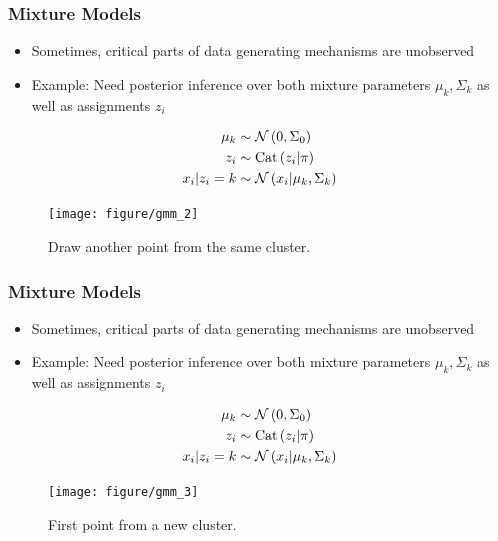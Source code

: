 \documentclass[10pt,mathserif]{beamer}
\begin{document}
\label{sec:latent_variable_models}
\begin{frame}
  \frametitle{Mixture Models}
  \begin{itemize}
  \item Sometimes, critical parts of data generating mechanisms are unobserved
    \item Example: Need posterior inference over both mixture parameters $\mu_k,
      \Sigma_k$ as well as assignments $z_i$
  \end{itemize}
  \begin{align*}
    \mu_{k} &\sim \mathcal{N}\left(0, \Sigma_{0}\right) \\
    z_i &\sim \textnormal{Cat}\left(z_i \vert \pi\right) \\
    x_i \vert z_i = k &\sim \mathcal{N}\left(x_i \vert \mu_{k}, \Sigma_k\right)
  \end{align*}
\begin{figure}[ht]
  \centering
  \texttt{[image: figure/gmm\_2]}
  \caption{Draw another point from the same cluster.
    \label{fig:gmm_2} }
\end{figure}
\end{frame}

\label{sec:latent_variable_models}
\begin{frame}
  \frametitle{Mixture Models}
  \begin{itemize}
  \item Sometimes, critical parts of data generating mechanisms are unobserved
    \item Example: Need posterior inference over both mixture parameters $\mu_k,
      \Sigma_k$ as well as assignments $z_i$
  \end{itemize}
  \begin{align*}
    \mu_{k} &\sim \mathcal{N}\left(0, \Sigma_{0}\right) \\
    z_i &\sim \textnormal{Cat}\left(z_i \vert \pi\right) \\
    x_i \vert z_i = k &\sim \mathcal{N}\left(x_i \vert \mu_{k}, \Sigma_k\right)
  \end{align*}
\begin{figure}[ht]
  \centering
  \texttt{[image: figure/gmm\_3]}
  \caption{First point from a new cluster. \label{fig:gmm_3}}
\end{figure}
\end{frame}
\end{document}
